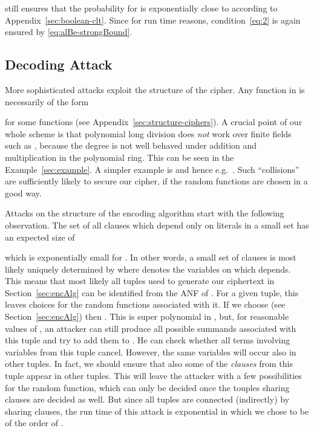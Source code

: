 \documentclass[final,journal,compsoc]{IEEEtran}
\begin{document}
still ensures that the probability for  is exponentially close
to  according to Appendix~\ref{sec:boolean-clt}.
Since  for run time
 reasons, condition~\eqref{eq:2} is again ensured by \eqref{eq:alBe-strongBound}.



\subsection{Decoding Attack\label{sec:decoding-attack}}

More sophisticated attacks exploit the structure of
the cipher. 
Any function in  is necessarily of the form

for some functions  (see
Appendix~\ref{sec:structure-ciphers}). 
A crucial point of our whole scheme is that polynomial long division
does \emph{not} work over finite fields such as , because
the degree is not well behaved under addition and multiplication in
the polynomial ring.  This can be seen in the
Example~\ref{sec:example}.  A simpler example is  and hence
e.g.\ .  Such ``collisions'' are sufficiently
likely to secure our cipher, if the random functions  are chosen
in a good way.


Attacks on the structure of the encoding algorithm start with
the following observation.
The set of all clauses which depend only on literals in a small set
 has an expected size of

which is exponentially small for . In other words, a small
set of clauses  is most likely uniquely determined by  where
 denotes the variables on
which  depends. This means that most likely all tuples
 used to
generate our ciphertext  in Section~\ref{sec:encAlg} can be identified
from the ANF of . For a given tuple,
this leaves  choices for the random functions
associated with it. 
If we choose  (see Section~\ref{sec:encAlg}) then
. This is super polynomial in
, but, for reasonable values of , an attacker can still produce all possible summands associated with
this tuple and try to add them to . He can check whether all terms
involving variables from this tuple cancel. However, the same
variables will occur also in other tuples. In fact, we
should ensure that also some of the \emph{clauses} from this tuple appear in
other tuples. This will leave the attacker with a few possibilities for the random
function, which can only be decided once the touples sharing clauses are
decided as well. But since all tuples are connected
(indirectly) by sharing clauses, the run time of this attack is
exponential in  which we chose to be of the order of .
\end{document}

